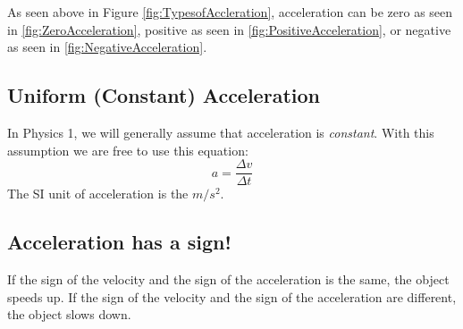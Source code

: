 As seen above in Figure \ref{fig:TypesofAccleration}, acceleration can be zero as seen in \ref{fig:ZeroAcceleration}, positive as seen in \ref{fig:PositiveAcceleration}, or negative as seen in \ref{fig:NegativeAcceleration}.
	
\subsection{Uniform (Constant) Acceleration}
In Physics 1, we will generally assume that acceleration is \textit{constant}. With this assumption we are free to use this equation: \[a=\frac{\Delta v}{\Delta t}\] 
The SI unit of acceleration is the $m/s^2$.
	
\subsection{Acceleration has a sign!}
If the sign of the velocity and the sign of the acceleration is the same, the object speeds up. If the sign of the velocity and the sign of the acceleration are different, the object slows down.